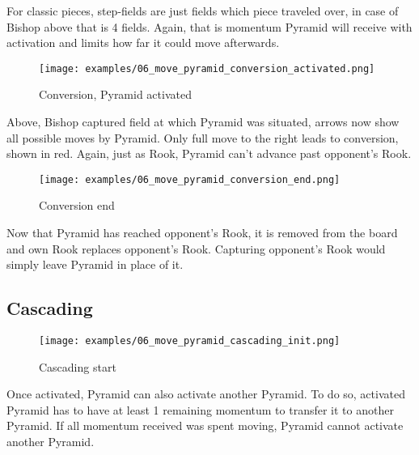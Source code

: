 For classic pieces, step-fields are just fields which piece traveled over,
in case of Bishop above that is 4 fields. Again, that is momentum Pyramid
will receive with activation and limits how far it could move afterwards.

\clearpage %

\noindent
\begin{figure}[!t]
\texttt{[image: examples/06\_move\_pyramid\_conversion\_activated.png]}
\caption{Conversion, Pyramid activated}
\label{fig:ma_conversion_activated}
\end{figure}

Above, Bishop captured field at which Pyramid was situated, arrows now show
all possible moves by Pyramid. Only full move to the right leads to conversion,
shown in red. Again, just as Rook, Pyramid can't advance past opponent's Rook.

\clearpage %

\noindent
\begin{figure}[!t]
\texttt{[image: examples/06\_move\_pyramid\_conversion\_end.png]}
\caption{Conversion end}
\label{fig:ma_conversion_end}
\end{figure}

Now that Pyramid has reached opponent's Rook, it is removed from the board and
own Rook replaces opponent's Rook. Capturing opponent's Rook would simply leave
Pyramid in place of it.

\clearpage %

\subsection*{Cascading}

\noindent
\begin{figure}[!h]
\texttt{[image: examples/06\_move\_pyramid\_cascading\_init.png]}
\caption{Cascading start}
\label{fig:ma_cascading_init}
\end{figure}

Once activated, Pyramid can also activate another Pyramid. To do so, activated
Pyramid has to have at least 1 remaining momentum to transfer it to another
Pyramid. If all momentum received was spent moving, Pyramid cannot activate
another Pyramid.

